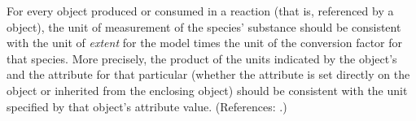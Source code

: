 For every \Species object produced or consumed in a reaction (that is, referenced
by a \SpeciesReference object), the unit of
measurement of the species' substance should be consistent with the unit of 
\emph{extent} for the model times the unit of the conversion
factor for that species.  More precisely, the product of the units indicated by the
\Model object's  and the  attribute for
that particular \Species (whether
the attribute is set directly on the \Species object or inherited from
the enclosing \Model object) should be consistent with the unit specified
by that \Species object's  attribute value.  (References:
.)
